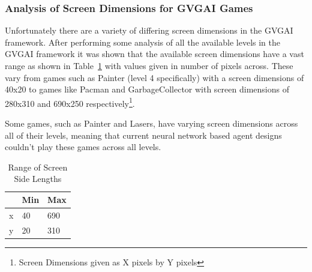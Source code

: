 \subsubsection{Analysis of Screen Dimensions for GVGAI Games}

Unfortunately there are a variety of differing screen dimensions in the GVGAI framework.
After performing some analysis of all the available levels in the GVGAI framework it was shown that the available screen dimensions have a vast range as shown in Table~\ref{tab:ScreenDimensions} with values given in number of pixels across.
These vary from games such as Painter (level 4 specifically) with a screen dimensions of 40x20 to games like Pacman and GarbageCollector with screen dimensions of 280x310 and 690x250 respectively\footnote{Screen Dimensions given as X pixels by Y pixels}.
\par
Some games, such as Painter and Lasers, have varying screen dimensions across all of their levels, meaning that current neural network based agent designs couldn't play these games 
across all levels.
\begin{table}[t]
\normalsize
\caption {Range of Screen Side Lengths} \label{tab:ScreenDimensions} 
\begin{center}
    \begin{tabular}{l|ll}
          & Min & Max \\ \hline
        x & 40  & 690 \\
        y & 20  & 310
    \end{tabular}
\end{center}
\end{table}

